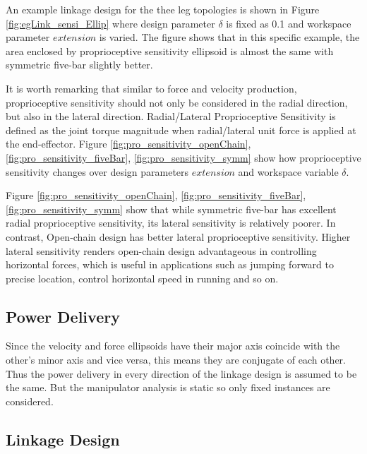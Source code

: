 	An example linkage design for the thee leg topologies is shown in Figure \ref{fig:egLink_sensi_Ellip} where design parameter $\delta$ is fixed as 0.1 and workspace parameter $extension$ is varied. The figure shows that in this specific example, the area enclosed by proprioceptive sensitivity ellipsoid is almost the same with symmetric five-bar slightly better.

	It is worth remarking that similar to force and velocity production, proprioceptive sensitivity should not only be considered in the radial direction, but also in the lateral direction. Radial/Lateral Proprioceptive Sensitivity is defined as the joint torque magnitude when radial/lateral unit force is applied at the end-effector. Figure \ref{fig:pro_sensitivity_openChain}, \ref{fig:pro_sensitivity_fiveBar}, \ref{fig:pro_sensitivity_symm} show how proprioceptive sensitivity changes over design parameters $extension$ and workspace variable $\delta$.
	
	Figure \ref{fig:pro_sensitivity_openChain}, \ref{fig:pro_sensitivity_fiveBar}, \ref{fig:pro_sensitivity_symm} show that while symmetric five-bar has excellent radial proprioceptive sensitivity, its lateral sensitivity is relatively poorer. In contrast, Open-chain design has better lateral proprioceptive sensitivity. Higher lateral sensitivity renders open-chain design advantageous in controlling horizontal forces, which is useful in applications such as jumping forward to precise location, control horizontal speed in running and so on.
	
	\subsection{Power Delivery}
	\label{sec:powerDelivery}
	
	Since the velocity and force ellipsoids have their major axis coincide with the other's minor axis and vice versa, this means they are conjugate of each other. Thus the power delivery in every direction of the linkage design is assumed to be the same. But the manipulator analysis is static so only fixed instances are considered.
	
	
	\subsection{Linkage Design}
	\label{sec:LinkageDesign}
	
